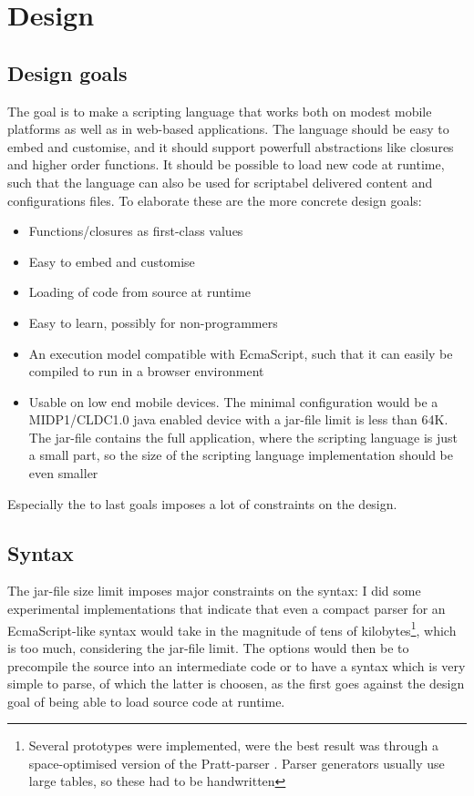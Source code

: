 \chapter{Design}
\section{Design goals}

The goal is to make a scripting language that works both on modest mobile platforms as well as in web-based applications.
The language should be easy to embed and customise, and it should support powerfull abstractions like closures and higher order functions.
It should be possible to load new code at runtime, such that the language can also be used for scriptabel delivered content and configurations files.
To elaborate these are the more concrete design goals:
\begin{itemize}
\item Functions/closures as first-class values
\item Easy to embed and customise
\item Loading of code from source at runtime
\item Easy to learn, possibly for non-programmers
\item An execution model compatible with EcmaScript, such that it can easily be compiled to run in a browser environment
\item Usable on low end mobile devices. The minimal configuration would be a MIDP1/CLDC1.0 java enabled device with a jar-file limit is less than 64K. The jar-file contains the full application, where the scripting language is just a small part, so the size of the scripting language implementation should be even smaller
\end{itemize}
Especially the to last goals imposes a lot of constraints on the design.


\section{Syntax}
The jar-file size limit imposes major constraints on the syntax: I did some experimental implementations that indicate that even a compact parser for an EcmaScript-like syntax would take in the magnitude of tens of kilobytes\footnote{Several prototypes were implemented, were the best result was through a space-optimised version of the Pratt-parser \cite{pratt, beautiful-code}. Parser generators usually use large tables, so these had to be handwritten}, which is too much, considering the jar-file limit. 
The options would then be to precompile the source into an intermediate code or to have a syntax which is very simple to parse, of which the latter is choosen, as the first goes against the design goal of being able to load source code at runtime. 

